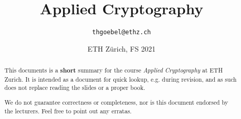 \documentclass[paper=a4, parskip=half-]{scrartcl}
\title{Applied Cryptography}
\author{\texttt{thgoebel@ethz.ch}}
\date{ETH Zürich, FS 2021}
\begin{document}
\begin{titlepage}
\maketitle
\vspace{5cm}
\thispagestyle{empty}


\begin{abstract}
This documents is a \textbf{short} summary for the course \textit{Applied Cryptography} at ETH Zurich.
It is intended as a document for quick lookup, e.g. during revision, and as such does not replace reading the slides or a proper book.

We do not guarantee correctness or completeness, nor is this document endorsed by the lecturers.
Feel free to point out any erratas.
\end{abstract}

\end{titlepage}

\tableofcontents
\newpage


\newpage
\end{document}
